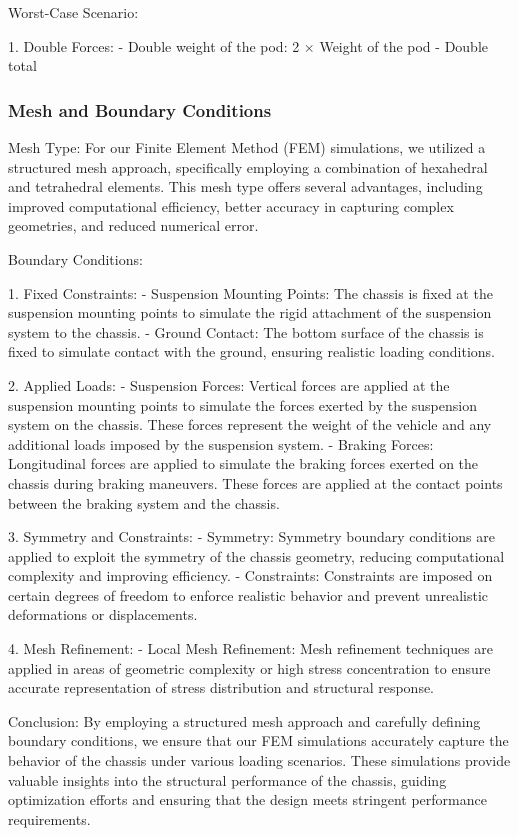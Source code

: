 Worst-Case Scenario:

1.	Double Forces:
-	Double weight of the pod: 2 × Weight of the pod
-	Double total


\subsubsection{Mesh and Boundary Conditions}

Mesh Type: For our Finite Element Method (FEM) simulations, we utilized a structured mesh approach, specifically employing a combination of hexahedral and tetrahedral elements. This mesh type offers several advantages, including improved computational efficiency, better accuracy in capturing complex geometries, and reduced numerical error.

Boundary Conditions:

1.	Fixed Constraints:
-	Suspension Mounting Points: The chassis is fixed at the suspension mounting points to simulate the rigid attachment of the suspension system to the chassis.
-	Ground Contact: The bottom surface of the chassis is fixed to simulate contact with the ground, ensuring realistic loading conditions.

2.	Applied Loads:
-	Suspension Forces: Vertical forces are applied at the suspension mounting points to simulate the forces exerted by the suspension system on the chassis. These forces represent the weight of the vehicle and any additional loads imposed by the suspension system.
-	Braking Forces: Longitudinal forces are applied to simulate the braking forces exerted on the chassis during braking maneuvers. These forces are applied at the contact points between the braking system and the chassis.

3.	Symmetry and Constraints:
-	Symmetry: Symmetry boundary conditions are applied to exploit the symmetry of the chassis geometry, reducing computational complexity and improving efficiency.
-	Constraints: Constraints are imposed on certain degrees of freedom to enforce realistic behavior and prevent unrealistic deformations or displacements.

4.	Mesh Refinement:
-	Local Mesh Refinement: Mesh refinement techniques are applied in areas of geometric complexity or high stress concentration to ensure accurate representation of stress distribution and structural response.

Conclusion: By employing a structured mesh approach and carefully defining boundary conditions, we ensure that our FEM simulations accurately capture the behavior of the chassis under various loading scenarios. These simulations provide valuable insights into the structural performance of the chassis, guiding optimization efforts and ensuring that the design meets stringent performance requirements.

